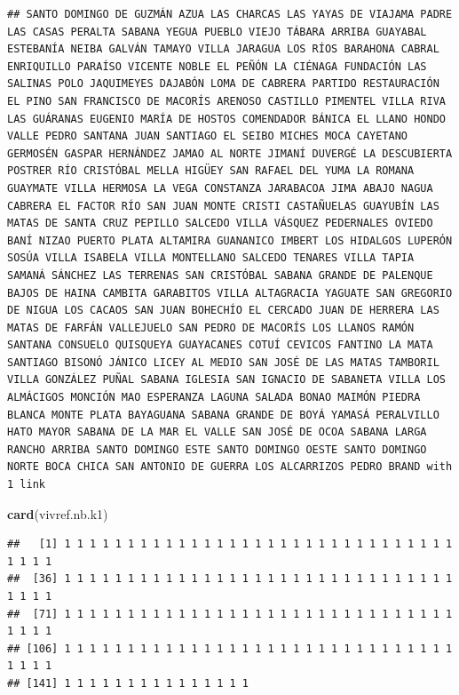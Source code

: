 \documentclass[11pt,]{article}
\newenvironment{Shaded}{\begin{snugshade}}{\end{snugshade}}
\newcommand{\KeywordTok}[1]{\textcolor[rgb]{0.13,0.29,0.53}{\textbf{#1}}}
\newcommand{\NormalTok}[1]{#1}
\begin{document}
\begin{verbatim}
## SANTO DOMINGO DE GUZMÁN AZUA LAS CHARCAS LAS YAYAS DE VIAJAMA PADRE LAS CASAS PERALTA SABANA YEGUA PUEBLO VIEJO TÁBARA ARRIBA GUAYABAL ESTEBANÍA NEIBA GALVÁN TAMAYO VILLA JARAGUA LOS RÍOS BARAHONA CABRAL ENRIQUILLO PARAÍSO VICENTE NOBLE EL PEÑÓN LA CIÉNAGA FUNDACIÓN LAS SALINAS POLO JAQUIMEYES DAJABÓN LOMA DE CABRERA PARTIDO RESTAURACIÓN EL PINO SAN FRANCISCO DE MACORÍS ARENOSO CASTILLO PIMENTEL VILLA RIVA LAS GUÁRANAS EUGENIO MARÍA DE HOSTOS COMENDADOR BÁNICA EL LLANO HONDO VALLE PEDRO SANTANA JUAN SANTIAGO EL SEIBO MICHES MOCA CAYETANO GERMOSÉN GASPAR HERNÁNDEZ JAMAO AL NORTE JIMANÍ DUVERGÉ LA DESCUBIERTA POSTRER RÍO CRISTÓBAL MELLA HIGÜEY SAN RAFAEL DEL YUMA LA ROMANA GUAYMATE VILLA HERMOSA LA VEGA CONSTANZA JARABACOA JIMA ABAJO NAGUA CABRERA EL FACTOR RÍO SAN JUAN MONTE CRISTI CASTAÑUELAS GUAYUBÍN LAS MATAS DE SANTA CRUZ PEPILLO SALCEDO VILLA VÁSQUEZ PEDERNALES OVIEDO BANÍ NIZAO PUERTO PLATA ALTAMIRA GUANANICO IMBERT LOS HIDALGOS LUPERÓN SOSÚA VILLA ISABELA VILLA MONTELLANO SALCEDO TENARES VILLA TAPIA SAMANÁ SÁNCHEZ LAS TERRENAS SAN CRISTÓBAL SABANA GRANDE DE PALENQUE BAJOS DE HAINA CAMBITA GARABITOS VILLA ALTAGRACIA YAGUATE SAN GREGORIO DE NIGUA LOS CACAOS SAN JUAN BOHECHÍO EL CERCADO JUAN DE HERRERA LAS MATAS DE FARFÁN VALLEJUELO SAN PEDRO DE MACORÍS LOS LLANOS RAMÓN SANTANA CONSUELO QUISQUEYA GUAYACANES COTUÍ CEVICOS FANTINO LA MATA SANTIAGO BISONÓ JÁNICO LICEY AL MEDIO SAN JOSÉ DE LAS MATAS TAMBORIL VILLA GONZÁLEZ PUÑAL SABANA IGLESIA SAN IGNACIO DE SABANETA VILLA LOS ALMÁCIGOS MONCIÓN MAO ESPERANZA LAGUNA SALADA BONAO MAIMÓN PIEDRA BLANCA MONTE PLATA BAYAGUANA SABANA GRANDE DE BOYÁ YAMASÁ PERALVILLO HATO MAYOR SABANA DE LA MAR EL VALLE SAN JOSÉ DE OCOA SABANA LARGA RANCHO ARRIBA SANTO DOMINGO ESTE SANTO DOMINGO OESTE SANTO DOMINGO NORTE BOCA CHICA SAN ANTONIO DE GUERRA LOS ALCARRIZOS PEDRO BRAND with 1 link
\end{verbatim}

\begin{Shaded}
\begin{Highlighting}[]
\KeywordTok{card}\NormalTok{(vivref.nb.k1)}
\end{Highlighting}
\end{Shaded}

\begin{verbatim}
##   [1] 1 1 1 1 1 1 1 1 1 1 1 1 1 1 1 1 1 1 1 1 1 1 1 1 1 1 1 1 1 1 1 1 1 1 1
##  [36] 1 1 1 1 1 1 1 1 1 1 1 1 1 1 1 1 1 1 1 1 1 1 1 1 1 1 1 1 1 1 1 1 1 1 1
##  [71] 1 1 1 1 1 1 1 1 1 1 1 1 1 1 1 1 1 1 1 1 1 1 1 1 1 1 1 1 1 1 1 1 1 1 1
## [106] 1 1 1 1 1 1 1 1 1 1 1 1 1 1 1 1 1 1 1 1 1 1 1 1 1 1 1 1 1 1 1 1 1 1 1
## [141] 1 1 1 1 1 1 1 1 1 1 1 1 1 1 1
\end{verbatim}
\end{document}
